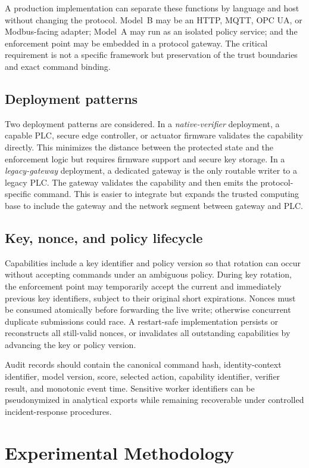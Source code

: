 \documentclass[journal]{IEEEtran}
\begin{document}
A production implementation can separate these functions by language and host without changing the protocol. Model~B may be an HTTP, MQTT, OPC UA, or Modbus-facing adapter; Model~A may run as an isolated policy service; and the enforcement point may be embedded in a protocol gateway. The critical requirement is not a specific framework but preservation of the trust boundaries and exact command binding.

\subsection{Deployment patterns}
Two deployment patterns are considered. In a \emph{native-verifier} deployment, a capable PLC, secure edge controller, or actuator firmware validates the capability directly. This minimizes the distance between the protected state and the enforcement logic but requires firmware support and secure key storage. In a \emph{legacy-gateway} deployment, a dedicated gateway is the only routable writer to a legacy PLC. The gateway validates the capability and then emits the protocol-specific command. This is easier to integrate but expands the trusted computing base to include the gateway and the network segment between gateway and PLC.

\subsection{Key, nonce, and policy lifecycle}
Capabilities include a key identifier and policy version so that rotation can occur without accepting commands under an ambiguous policy. During key rotation, the enforcement point may temporarily accept the current and immediately previous key identifiers, subject to their original short expirations. Nonces must be consumed atomically before forwarding the live write; otherwise concurrent duplicate submissions could race. A restart-safe implementation persists or reconstructs all still-valid nonces, or invalidates all outstanding capabilities by advancing the key or policy version.

Audit records should contain the canonical command hash, identity-context identifier, model version, score, selected action, capability identifier, verifier result, and monotonic event time. Sensitive worker identifiers can be pseudonymized in analytical exports while remaining recoverable under controlled incident-response procedures.

\section{Experimental Methodology}
\end{document}

